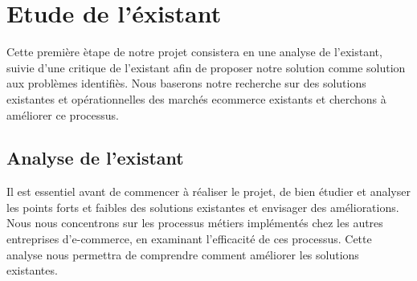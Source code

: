 \section{Etude de l'éxistant}
\noindent
Cette première ètape de notre projet consistera en une analyse de l'existant, suivie d'une critique de l'existant afin de proposer notre solution comme solution aux problèmes identifiès. Nous baserons notre recherche sur des solutions existantes et opérationnelles des marchés ecommerce existants et cherchons à améliorer ce processus.

\subsection{Analyse de l'existant}
\noindent
Il est essentiel avant de commencer à réaliser le projet, de bien étudier et analyser les points forts et faibles des solutions existantes et envisager des améliorations. Nous nous concentrons sur les processus métiers implémentés chez les autres entreprises d'e-commerce, en examinant l'efficacité de ces processus. Cette analyse nous permettra de comprendre comment améliorer les solutions existantes.

